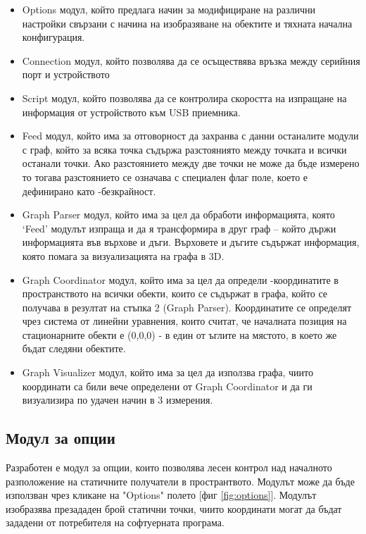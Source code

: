 \begin{itemize}
    \item Options модул, който предлага начин за модифициране на различни настройки свързани с начина на изобразяване на обектите и тяхната начална конфигурация.
    \item Connection модул, който позволява да се осъществява връзка между серийния порт и устройството
    \item Script модул, който позволява да се контролира скоростта на изпращане на информация от устройството към USB приемника.
    \item Feed  модул, който има за отговорност да захранва с данни останалите модули с граф, който за всяка точка съдържа разстояниято между точката и всички останали точки. Ако разстоянието между две точки не може да бъде измерено то тогава разстоянието се означава с специален флаг поле, което е дефинирано като -безкрайност.
    \item Graph Parser модул, който има за цел да обработи информацията, която ‘Feed’ модулът изпраща и да я трансформира в друг граф – който държи информацията във върхове и дъги. Върховете и дъгите съдържат информация, която помага за визуализацията на графа в 3D.
    \item Graph Coordinator модул, който има за цел да определи -координатите в пространството на всички обекти, които се съдържат в графа, който се получава в резултат на стъпка 2 (Graph Parser). Координатите се определят чрез система от линейни уравнения, които считат, че началната позиция на стационарните обекти е (0,0,0) - в един от ъглите на мястото, в което же бъдат следяни обектите.
    \item Graph Visualizer модул, който има за цел да използва графа, чиито координати са били вече определени от Graph Coordinator и да ги визуализира по удачен начин в 3 измерения.

\end{itemize}

\pagebreak

\subsection{Модул за опции}
Разработен е модул за опции, които позволява лесен контрол над началното разположение на статичните получатели в пространтвото. Модулът може да бъде използван чрез кликане на "Options" полето [фиг \ref{fig:options}]. Модулът изобразява презададен брой статични точки, чиито координати могат да бъдат зададени от потребителя на софтуерната програма. 

